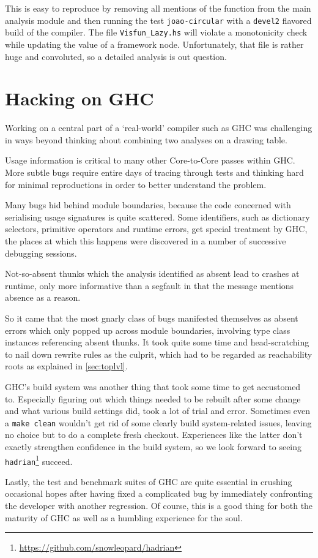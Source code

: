 This is easy to reproduce by removing all mentions of the  function from the main analysis module and then running the test \texttt{joao-circular} with a \texttt{devel2} flavored build of the compiler.
The file \texttt{Visfun\_Lazy.hs} will violate a monotonicity check while updating the value of a framework node.
Unfortunately, that file is rather huge and convoluted, so a detailed analysis is out question.

\section{Hacking on GHC}

Working on a central part of a `real-world' compiler such as GHC was challenging in ways beyond thinking about combining two analyses on a drawing table.

Usage information is critical to many other Core-to-Core passes within GHC\@.
More subtle bugs require entire days of tracing through tests and thinking hard for minimal reproductions in order to better understand the problem.

Many bugs hid behind module boundaries, because the code concerned with serialising usage signatures is quite scattered.
Some identifiers, such as dictionary selectors, primitive operators and runtime errors, get special treatment by GHC, the places at which this happens were discovered in a number of successive debugging sessions.

Not-so-absent thunks which the analysis identified as absent lead to crashes at runtime, only more informative than a segfault in that the message mentions absence as a reason.

So it came that the most gnarly class of bugs manifested themselves as absent errors which only popped up across module boundaries, involving type class instances referencing absent thunks.
It took quite some time and head-scratching to nail down rewrite rules as the culprit, which had to be regarded as reachability roots as explained in \cref{sec:toplvl}.

GHC's build system was another thing that took some time to get accustomed to.
Especially figuring out which things needed to be rebuilt after some change and what various build settings did, took a lot of trial and error.
Sometimes even a \texttt{make clean} wouldn't get rid of some clearly build system-related issues, leaving no choice but to do a complete fresh checkout.
Experiences like the latter don't exactly strengthen confidence in the build system, so we look forward to seeing \texttt{hadrian}\footnote{\url{https://github.com/snowleopard/hadrian}} succeed.

Lastly, the test and benchmark suites of GHC are quite essential in crushing occasional hopes after having fixed a complicated bug by immediately confronting the developer with another regression.
Of course, this is a good thing for both the maturity of GHC as well as a humbling experience for the soul.
